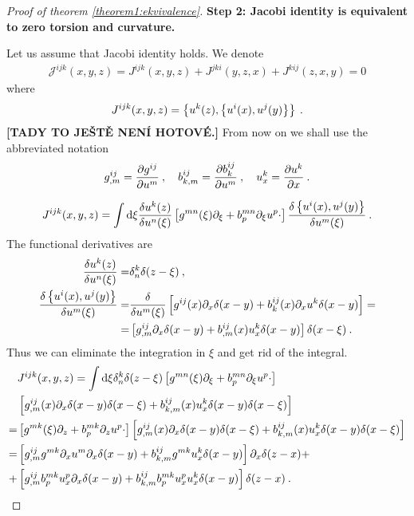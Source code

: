 \begin{proof}[Proof of theorem \ref{theorem1:ekvivalence}]
    \textbf{Step 2: Jacobi identity is equivalent to zero torsion and curvature.} 
    
    Let us assume that Jacobi identity holds. We denote
    \begin{align}
        \mathcal J^{ijk}(x,y,z) = J^{ijk}(x,y,z)+ J^{jki}(y,z,x)+ J^{kij}(z,x,y) = 0
    \end{align}
    where
    \begin{align}
        J^{ijk}(x,y,z) = \left \lbrace u^k(z) , \left \lbrace u^i(x),u^j(y) \right \rbrace \right \rbrace \:.
    \end{align}
    \textbf{[TADY TO JEŠTĚ NENÍ HOTOVÉ.]}
    From now on we shall use the abbreviated notation
    \begin{align}
        g^{ij}_{,m} = \frac{\partial g^{ij}}{\partial u^m} \:, \quad b^{ij}_{k,m} = \frac{\partial b^{ij}_k}{\partial u^m} \:, \quad u^k_x = \frac{\partial u^k}{\partial x}  \:.
    \end{align}

    \begin{align*}
        J^{ijk}(x,y,z) =
        \int \mathrm{d} \xi \frac{\delta u^k(z)}{\delta u^n(\xi)}
        \left[ g^{mn}(\xi) \partial_\xi + b^{mn}_p \partial_\xi u^p \cdot \right] \frac{\delta \left \lbrace u^i(x),u^j(y) \right \rbrace}{\delta u^m(\xi)}  \:.
    \end{align*}
    The functional derivatives are
    \begin{align}
        \frac{\delta u^k(z)}{\delta u^n(\xi)} =& \delta^k_n \delta(z-\xi) \:, \\
        \frac{\delta \left \lbrace u^i(x),u^j(y) \right \rbrace}{\delta u^m(\xi)} =& \frac{\delta }{\delta u^m(\xi)} \left[ g^{ij}(x) \partial_x \delta(x-y) + b^{ij}_k(x) \partial_x u^k \delta(x-y)\right] = 
        \nonumber
        \\ =& \left[ g^{ij}_{,m} \partial_x \delta(x-y) + b^{ij}_{,m}(x) u^k_x \delta(x-y) \right] \delta (x-\xi) \:.
    \end{align}
    Thus we can eliminate the integration in $\xi$ and get rid of the integral.
    \begin{align*}
        & J^{ijk}(x,y,z) = \int \mathrm{d} \xi \delta^k_n \delta(z-\xi) \left[ g^{mn}(\xi) \partial_\xi + b^{mn}_p \partial_\xi u^p \cdot \right] \\ 
        & \left[ g^{ij}_{,m}(x) \partial_x \delta(x-y) \delta(x-\xi) + b^{ij}_{k,m}(x) u^k_x \delta(x-y) \delta(x-\xi) \right] 
        \\
        =& \left[ g^{mk}(\xi) \partial_z + b^{mk}_p \partial_z u^p \cdot \right] \left[ g^{ij}_{,m}(x) \partial_x \delta(x-y) \delta(x-\xi) + b^{ij}_{k,m}(x) u^k_x \delta(x-y) \delta(x-\xi) \right]
        \\
        =& \left[ g^{ij}_{,m} g^{mk} \partial_x u^m \partial_x \delta(x-y) + b^{ij}_{k,m} g^{mk} u^k_x \delta(x-y) \right] \partial_x \delta(z-x) + 
        \\
        +& \left[ g^{ij}_{,m} b^{mk}_p u^p_x \partial_x \delta(x-y) + b^{ij}_{k,m} b^{mk}_p u_x^p  u_x^k \delta(x-y) \right] \delta(z-x) \:.
    \end{align*}


\end{proof}
